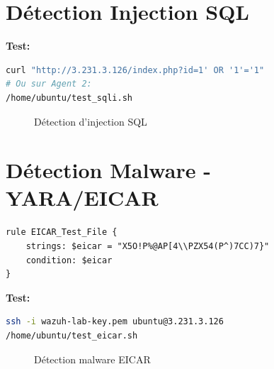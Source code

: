 \documentclass[12pt,a4paper]{article}
\begin{document}
\section{Détection Injection SQL}

\textbf{Test:}
\begin{lstlisting}[language=bash]
curl "http://3.231.3.126/index.php?id=1' OR '1'='1"
# Ou sur Agent 2:
/home/ubuntu/test_sqli.sh
\end{lstlisting}

\begin{figure}[H]
    \centering
    \caption{Détection d'injection SQL}
    \label{fig:sql-injection}
\end{figure}

\section{Détection Malware - YARA/EICAR}

\begin{lstlisting}
rule EICAR_Test_File {
    strings: $eicar = "X5O!P%@AP[4\\PZX54(P^)7CC)7}"
    condition: $eicar
}
\end{lstlisting}

\textbf{Test:}
\begin{lstlisting}[language=bash]
ssh -i wazuh-lab-key.pem ubuntu@3.231.3.126
/home/ubuntu/test_eicar.sh
\end{lstlisting}

\begin{figure}[H]
    \centering
    \caption{Détection malware EICAR}
    \label{fig:eicar}
\end{figure}
\end{document}
